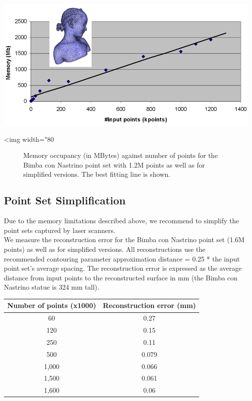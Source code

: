\begin{center}
    \begin{ccTexOnly}
        \includegraphics[width=1.0\textwidth]{Surface_reconstruction_points_3/memory_bench}
    \end{ccTexOnly}
    \begin{ccHtmlOnly}
        <img width="80%
    \end{ccHtmlOnly}
    \begin{figure}[h]
        \caption{Memory occupancy (in MBytes) against number of points
                 for the Bimba con Nastrino point set with 1.2M points
                 as well as for simplified versions.
                 The best fitting line is shown.}
        \label{Surface_reconstruction_points_3-fig-memory_bench}
    \end{figure}
\end{center}



\subsection{Point Set Simplification}

Due to the memory limitations described above, we recommend to simplify the point sets captured by laser scanners.\\
We measure the reconstruction error for the Bimba con Nastrino point set (1.6M points) as well as for simplified versions. All reconstructions use the recommended contouring parameter approximation distance = 0.25 * the input point set's average spacing.
The reconstruction error is expressed as the average distance from input points to the reconstructed surface in mm (the Bimba con Nastrino statue is 324 mm tall).

\begin{tabular}{|c|c|}
  \hline
  Number of points (x1000) & Reconstruction error (mm) \\
  \hline
  60                         & 0.27 \\
  120                        & 0.15 \\
  250                        & 0.11 \\
  500                        & 0.079 \\
  1,000                       & 0.066 \\
  1,500                       & 0.061 \\
  1,600                       & 0.06 \\
  \hline
\end{tabular}

